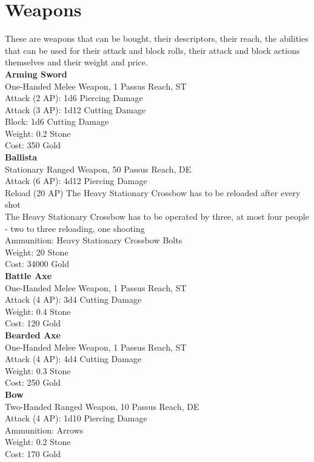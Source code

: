 \section{Weapons}
These are weapons that can be bought, their descriptors, their reach, the abilities that can be used for their attack and block rolls, their attack and block actions themselves and their weight and price.\\


\textbf{Arming Sword}\\
One-Handed Melee Weapon, 1 Passus Reach, ST\\
Attack (2 AP): 1d6 Piercing Damage\\
Attack (3 AP): 1d12 Cutting Damage\\
Block: 1d6 Cutting Damage\\
Weight: 0.2 Stone\\
Cost: 350 Gold\\


\textbf{Ballista}\\
Stationary Ranged Weapon, 50 Passus Reach, DE\\
Attack (6 AP): 4d12 Piercing Damage\\
Reload (20 AP) The Heavy Stationary Crossbow has to be reloaded after every shot\\
The Heavy Stationary Crossbow has to be operated by three, at most four people - two to three reloading, one shooting\\
Ammunition: Heavy Stationary Crossbow Bolts\\
Weight: 20 Stone\\
Cost: 34000 Gold\\


\textbf{Battle Axe}\\
One-Handed Melee Weapon, 1 Passus Reach, ST\\
Attack (4 AP): 3d4 Cutting Damage\\
Weight: 0.4 Stone\\
Cost: 120 Gold\\


\textbf{Bearded Axe}\\
One-Handed Melee Weapon, 1 Passus Reach, ST\\
Attack (4 AP): 4d4 Cutting Damage\\
Weight: 0.3 Stone\\
Cost: 250 Gold\\


\textbf{Bow}\\
Two-Handed Ranged Weapon, 10 Passus Reach, DE\\
Attack (4 AP): 1d10 Piercing Damage\\
Ammunition: Arrows\\
Weight: 0.2 Stone\\
Cost: 170 Gold\\


